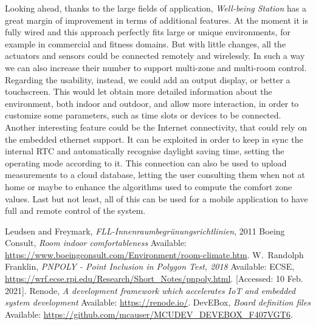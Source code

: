 \documentclass[peerreview]{IEEEtran}
\begin{document}
Looking ahead, thanks to the large fields of application, \emph{Well-being Station}
has a great  margin of improvement in terms of additional features. At the moment
it is fully wired and this approach perfectly fits large or unique environments,
for example in commercial and fitness domains. But with little changes, all the
actuators and sensors could be connected remotely and wirelessly. In such a way
we can also increase their number to support multi-zone and multi-room control.
Regarding the usability, instead, we could add an output display, or better a
touchscreen. This would let obtain more detailed information about the
environment, both indoor and outdoor, and allow more interaction, in order to
customize some parameters, such as time slots or devices to be connected.
Another interesting feature could be the Internet connectivity, that could rely
on the embedded ethernet support. It can be exploited in order to keep in sync
the internal RTC and automatically recognise daylight saving time, setting the
operating mode according to it. This connection can also be used to upload
measurements to a cloud database, letting the user consulting them when not at
home or maybe to enhance the algorithms used to compute the comfort zone
values. Last but not least, all of this can be used for a mobile application to
have full and remote control of the system.

\begin{thebibliography}{1}
		 Leudsen and Freymark,
			\emph{FLL-Innenraumbegrünungsrichtlinien}, 2011
		 Boeing Consult, \emph{Room indoor comfortableness} Available:
			\url{https://www.boeingconsult.com/Environment/room-climate.htm}.		 
		W.~Randolph Franklin, \emph{PNPOLY - Point
			Inclusion in Polygon Test, 2018} Available: ECSE,
			\url{https://wrf.ecse.rpi.edu/Research/Short_Notes/pnpoly.html}.
			[Accessed: 10 Feb. 2021].
		 Renode, \emph{A development framework which accelerates IoT and
			embedded system development} Available: \url{https://renode.io/}.
		DevEBox, \emph{Board definition files} Available:
			\url{https://github.com/mcauser/MCUDEV_DEVEBOX_F407VGT6}.	
	\end{thebibliography}
\end{document}
